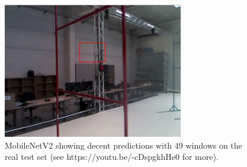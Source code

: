 \begin{figure}[h]
    \centering
    \includegraphics[width=0.7\textwidth]{figure/good_test_res.png}
    \caption[MobileNetV2 showing decent results]{MobileNetV2 showing decent
    predictions with 49 windows on the real test set (see
    https://youtu.be/-cDspgkhHe0 for more).}
    \label{fig:good-test}
\end{figure}
